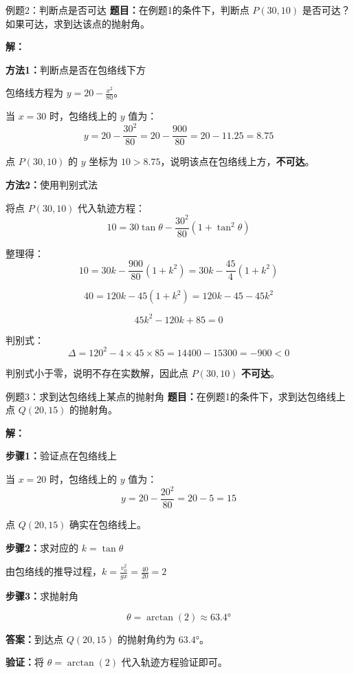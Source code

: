 \documentclass[a4paper,11pt]{ctexart}
\begin{document}
\begin{examplebox}{例题2：判断点是否可达}
\textbf{题目：}在例题1的条件下，判断点 $P(30, 10)$ 是否可达？如果可达，求到达该点的抛射角。

\textbf{解：}

\textbf{方法1：}判断点是否在包络线下方

包络线方程为 $y = 20 - \frac{x^2}{80}$。

当 $x = 30$ 时，包络线上的 $y$ 值为：
\[ y = 20 - \frac{30^2}{80} = 20 - \frac{900}{80} = 20 - 11.25 = 8.75 \]

点 $P(30, 10)$ 的 $y$ 坐标为 $10 > 8.75$，说明该点在包络线上方，\textbf{不可达}。

\textbf{方法2：}使用判别式法

将点 $P(30, 10)$ 代入轨迹方程：
\[ 10 = 30\tan\theta - \frac{30^2}{80}(1 + \tan^2\theta) \]

整理得：
\[ 10 = 30k - \frac{900}{80}(1 + k^2) = 30k - \frac{45}{4}(1 + k^2) \]

\[ 40 = 120k - 45(1 + k^2) = 120k - 45 - 45k^2 \]

\[ 45k^2 - 120k + 85 = 0 \]

判别式：
\[ \Delta = 120^2 - 4 \times 45 \times 85 = 14400 - 15300 = -900 < 0 \]

判别式小于零，说明不存在实数解，因此点 $P(30, 10)$ \textbf{不可达}。
\end{examplebox}

\begin{examplebox}{例题3：求到达包络线上某点的抛射角}
\textbf{题目：}在例题1的条件下，求到达包络线上点 $Q(20, 15)$ 的抛射角。

\textbf{解：}

\textbf{步骤1：}验证点在包络线上

当 $x = 20$ 时，包络线上的 $y$ 值为：
\[ y = 20 - \frac{20^2}{80} = 20 - 5 = 15 \]

点 $Q(20, 15)$ 确实在包络线上。

\textbf{步骤2：}求对应的 $k = \tan\theta$

由包络线的推导过程，$k = \frac{v_0^2}{gx} = \frac{40}{20} = 2$

\textbf{步骤3：}求抛射角

\[ \theta = \arctan(2) \approx 63.4° \]

\textbf{答案：}到达点 $Q(20, 15)$ 的抛射角约为 $63.4°$。

\textbf{验证：}将 $\theta = \arctan(2)$ 代入轨迹方程验证即可。
\end{examplebox}
\end{document}
